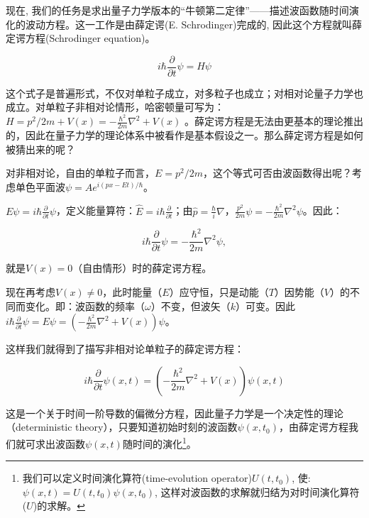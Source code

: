 现在,
我们的任务是求出量子力学版本的``牛顿第二定律''——描述波函数随时间演化的波动方程。这一工作是由薛定谔(E.
Schrodinger)完成的, 因此这个方程就叫薛定谔方程(Schrodinger
equation)。

\begin{equation}
    i\hbar \frac{\partial }{\partial t} \psi = H \psi
\end{equation}

这个式子是普遍形式，不仅对单粒子成立，对多粒子也成立；对相对论量子力学也成立。对单粒子非相对论情形，哈密顿量可写为：$H
= p^2/2m + V(x) = -\frac{\hbar^2}{2m} \nabla^2 +V(x)$
。薛定谔方程是无法由更基本的理论推出的，因此在量子力学的理论体系中被看作是基本假设之一。那么薛定谔方程是如何被猜出来的呢？

对非相对论，自由的单粒子而言，$E=
p^2/2m$，这个等式可否由波函数得出呢？考虑单色平面波$\psi = A e^{i
(px -Et )/ \hbar}$。


$E \psi = i \hbar \frac{\partial }{\partial t}
\psi$，定义能量算符：$\hat E = i \hbar \frac{\partial}{\partial
t}$；由$\hat p = \frac{\hbar}{i} \nabla$，$\frac{p^2}{2m} \psi = -
\frac{\hbar^2}{2m} \nabla^2 \psi$。因此：

\begin{equation}
i \hbar \frac{\partial}{\partial t} \psi = - \frac{\hbar^2}{2m}
\nabla^2 \psi,
\end{equation}

就是$V(x) = 0$（自由情形）时的薛定谔方程。

现在再考虑$V(x) \ne
0$，此时能量（$E$）应守恒，只是动能（$T$）因势能（$V$）的不同而变化。即：波函数的频率（$\omega$）不变，但波矢（$k$）可变。因此$i
\hbar \frac{\partial }{\partial t} \psi = E \psi =
(-\frac{\hbar^2}{2m} \nabla^2 +V(x)) \psi$。

这样我们就得到了描写非相对论单粒子的薛定谔方程：


\begin{equation}
i\hbar \frac{\partial }{{\partial t}}\psi (x,t) = \left( { -
\frac{{\hbar ^2 }}{{2m}}\nabla ^2  + V(x)} \right)\psi (x,t)
\end{equation}



这是一个关于时间一阶导数的偏微分方程，因此量子力学是一个决定性的理论（deterministic
theory），只要知道初始时刻的波函数$\psi (x,
t_0)$，由薛定谔方程我们就可求出波函数$\psi(x,t)$随时间的演化\footnote{我们可以定义时间演化算符(time-evolution
operator)$U(t,t_0)$, 使: $\psi(x,t) = U(t,t_0) \psi(x,t_0)$,
这样对波函数的求解就归结为对时间演化算符($U$)的求解。}。


